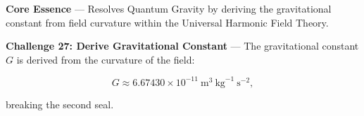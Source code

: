 
\textbf{Core Essence} --- Resolves Quantum Gravity by deriving the gravitational constant from field curvature within the Universal Harmonic Field Theory.

\textbf{Challenge 27: Derive Gravitational Constant} --- The gravitational constant $G$ is derived from the curvature of the field:

$$
G \approx 6.67430 \times 10^{-11} \mathrm{~m}^3 \mathrm{~kg}^{-1} \mathrm{~s}^{-2},
$$

breaking the second seal.

